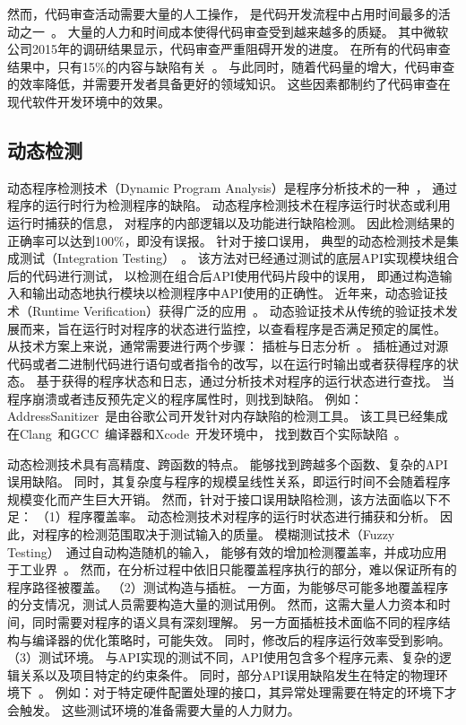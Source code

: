 然而，代码审查活动需要大量的人工操作，
是代码开发流程中占用时间最多的活动之一~\cite{13-esem-code-review}。
大量的人力和时间成本使得代码审查受到越来越多的质疑。
其中微软公司2015年的调研结果显示，代码审查严重阻碍开发的进度。
在所有的代码审查结果中，只有15\%的内容与缺陷有关~\cite{15-icse-code-review}。
与此同时，随着代码量的增大，代码审查的效率降低，并需要开发者具备更好的领域知识。
这些因素都制约了代码审查在现代软件开发环境中的效果。


\subsection{动态检测}
动态程序检测技术（Dynamic Program Analysis）是程序分析技术的一种~\cite{15-pa}，
通过程序的运行时行为检测程序的缺陷。
动态程序检测技术在程序运行时状态或利用运行时捕获的信息，
对程序的内部逻辑以及功能进行缺陷检测。
因此检测结果的正确率可以达到100\%，即没有误报。
针对于接口误用，
典型的动态检测技术是集成测试（Integration Testing）~\cite{17-trustcom-test}。
该方法对已经通过测试的底层API实现模块组合后的代码进行测试，
以检测在组合后API使用代码片段中的误用，
即通过构造输入和输出动态地执行模块以检测程序中API使用的正确性。
近年来，动态验证技术（Runtime Verification）获得广泛的应用~\cite{18-rv}。
动态验证技术从传统的验证技术发展而来，旨在运行时对程序的状态进行监控，以查看程序是否满足预定的属性。
从技术方案上来说，通常需要进行两个步骤：
插桩与日志分析~\cite{07-acm-valgrind, 12-atc-AddressSanitizer}。
插桩通过对源代码或者二进制代码进行语句或者指令的改写，以在运行时输出或者获得程序的状态。
基于获得的程序状态和日志，通过分析技术对程序的运行状态进行查找。
当程序崩溃或者违反预先定义的程序属性时，则找到缺陷。
例如：AddressSanitizer~\cite{12-atc-AddressSanitizer}是由谷歌公司开发针对内存缺陷的检测工具。
该工具已经集成在Clang~\cite{clang}和GCC~\cite{gcc}编译器和Xcode~\cite{Xcode}开发环境中，
找到数百个实际缺陷~\cite{AddressSanitizerFoundBugs}。


动态检测技术具有高精度、跨函数的特点。
能够找到跨越多个函数、复杂的API误用缺陷。
同时，其复杂度与程序的规模呈线性关系，即运行时间不会随着程序规模变化而产生巨大开销。
然而，针对于接口误用缺陷检测，该方法面临以下不足：
（1）程序覆盖率。
动态检测技术对程序的运行时状态进行捕获和分析。
因此，对程序的检测范围取决于测试输入的质量。
模糊测试技术（Fuzzy Testing）~\cite{18-fuzz}通过自动构造随机的输入，
能够有效的增加检测覆盖率，并成功应用于工业界~\cite{18-saner-fuzz}。
然而，在分析过程中依旧只能覆盖程序执行的部分，难以保证所有的程序路径被覆盖。
（2）测试构造与插桩。
一方面，为能够尽可能多地覆盖程序的分支情况，测试人员需要构造大量的测试用例。
然而，这需大量人力资本和时间，同时需要对程序的语义具有深刻理解。
另一方面插桩技术面临不同的程序结构与编译器的优化策略时，可能失效。
同时，修改后的程序运行效率受到影响。
（3）测试环境。
与API实现的测试不同，API使用包含多个程序元素、复杂的逻辑关系以及项目特定的约束条件。
同时，部分API误用缺陷发生在特定的物理环境下~\cite{15-kernel-sv}。
例如：对于特定硬件配置处理的接口，其异常处理需要在特定的环境下才会触发。
这些测试环境的准备需要大量的人力财力。

